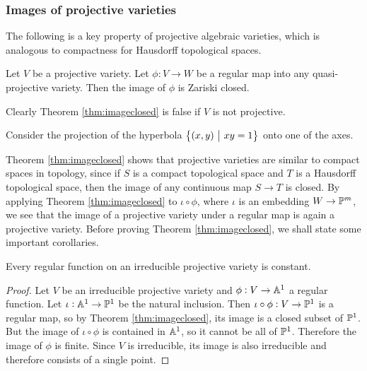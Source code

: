 \subsubsection{Images of projective varieties}

The following is a key property of projective algebraic varieties, which is analogous to compactness for Hausdorff topological spaces.

\begin{theorem}
\label{thm:imageclosed}
Let $ V $ be a projective variety. Let $ \phi : V \to W $ be a regular map into any quasi-projective variety. Then the image of $ \phi $ is Zariski closed.
\end{theorem}

Clearly Theorem \ref{thm:imageclosed} is false if $ V $ is not projective.

\begin{example*}
Consider the projection of the hyperbola $ \cbr{\br{x, y} \st xy = 1} $ onto one of the axes.
\end{example*}

\pagebreak

Theorem \ref{thm:imageclosed} shows that projective varieties are similar to compact spaces in topology, since if $ S $ is a compact topological space and $ T $ is a Hausdorff topological space, then the image of any continuous map $ S \to T $ is closed. By applying Theorem \ref{thm:imageclosed} to $ \iota \circ \phi $, where $ \iota $ is an embedding $ W \to \PP^m $, we see that the image of a projective variety under a regular map is again a projective variety. Before proving Theorem \ref{thm:imageclosed}, we shall state some important corollaries.

\begin{corollary}
\label{cor:regularconstant}
Every regular function on an irreducible projective variety is constant.
\end{corollary}

\begin{proof}
Let $ V $ be an irreducible projective variety and $ \phi : V \to \AA^1 $ a regular function. Let $ \iota : \AA^1 \to \PP^1 $ be the natural inclusion. Then $ \iota \circ \phi : V \to \PP^1 $ is a regular map, so by Theorem \ref{thm:imageclosed}, its image is a closed subset of $ \PP^1 $. But the image of $ \iota \circ \phi $ is contained in $ \AA^1 $, so it cannot be all of $ \PP^1 $. Therefore the image of $ \phi $ is finite. Since $ V $ is irreducible, its image is also irreducible and therefore consists of a single point.
\end{proof}

